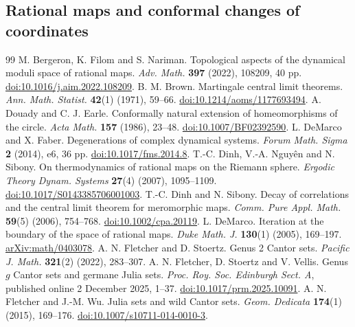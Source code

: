 \documentclass[10pt,a4paper]{amsart}
\numberwithin{equation}{section}
\begin{document}
\subsection{Rational maps and conformal changes of coordinates}\label{subsec:rational-conjugates}


\begin{thebibliography}{99}
 M. Bergeron, K. Filom and S. Nariman. Topological aspects of the dynamical moduli space of rational maps. \emph{Adv. Math.} \textbf{397} (2022), 108209, 40 pp. \href{https://doi.org/10.1016/j.aim.2022.108209}{doi:10.1016/j.aim.2022.108209}.
 B. M. Brown. Martingale central limit theorems. \emph{Ann. Math. Statist.} \textbf{42}(1) (1971), 59--66. \href{https://doi.org/10.1214/aoms/1177693494}{doi:10.1214/aoms/1177693494}.
 A. Douady and C. J. Earle. Conformally natural extension of homeomorphisms of the circle. \emph{Acta Math.} \textbf{157} (1986), 23--48. \href{https://doi.org/10.1007/BF02392590}{doi:10.1007/BF02392590}.
 L. DeMarco and X. Faber. Degenerations of complex dynamical systems. \emph{Forum Math. Sigma} \textbf{2} (2014), e6, 36 pp. \href{https://doi.org/10.1017/fms.2014.8}{doi:10.1017/fms.2014.8}.
 T.-C. Dinh, V.-A. Nguy\^en and N. Sibony. On thermodynamics of rational maps on the Riemann sphere. \emph{Ergodic Theory Dynam. Systems} \textbf{27}(4) (2007), 1095--1109. \href{https://doi.org/10.1017/S0143385706001003}{doi:10.1017/S0143385706001003}.
 T.-C. Dinh and N. Sibony. Decay of correlations and the central limit theorem for meromorphic maps. \emph{Comm. Pure Appl. Math.} \textbf{59}(5) (2006), 754--768. \href{https://doi.org/10.1002/cpa.20119}{doi:10.1002/cpa.20119}.
 L. DeMarco. Iteration at the boundary of the space of rational maps. \emph{Duke Math. J.} \textbf{130}(1) (2005), 169--197. \href{https://arxiv.org/abs/math/0403078}{arXiv:math/0403078}.
 A. N. Fletcher and D. Stoertz. Genus 2 Cantor sets. \emph{Pacific J. Math.} \textbf{321}(2) (2022), 283--307.
 A. N. Fletcher, D. Stoertz and V. Vellis. Genus $g$ Cantor sets and germane Julia sets. \emph{Proc. Roy. Soc. Edinburgh Sect. A}, published online 2 December 2025, 1--37. \href{https://doi.org/10.1017/prm.2025.10091}{doi:10.1017/prm.2025.10091}.
 A. N. Fletcher and J.-M. Wu. Julia sets and wild Cantor sets. \emph{Geom. Dedicata} \textbf{174}(1) (2015), 169--176. \href{https://doi.org/10.1007/s10711-014-0010-3}{doi:10.1007/s10711-014-0010-3}.

\end{thebibliography}
\end{document}
